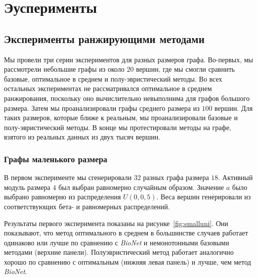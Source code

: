 \chapter{Эусперименты}





\section{Эксперименты ранжирующими методами}
\label{sec_experiments}

Мы провели три серии экспериментов для разных размеров графа.  Во-первых, мы
рассмотрели небольшие графы из около $20$ вершин, где мы смогли сравнить базовые,
оптимальное в среднем и полу-эвристический методы.  Во всех остальных
экспериментах не рассматривался оптимальное в среднем ранжирования, поскольку
оно вычислительно невыполнима для графов большого размера.  Затем мы
проанализировали графы среднего размера из $100$ вершин.  Для таких размеров,
которые ближе к реальным, мы проанализировали базовые и полу-эвристический
методы.  В конце мы протестировали методы на графе, взятого из реальных данных
из двух тысяч вершин.





\subsection{Графы маленького размера}

В первом эксперименте мы сгенерировали $32$ разных графа размера $18$.
Активный модуль размера $4$ был выбран равномерно случайным образом.  Значение
$a$ было выбрано равномерно из распределения $U(0, 0,5)$.  Веса вершин
генерировали из соответствующих бета- и равномерных распределений.

Результаты первого эксперимента показаны на рисунке~\ref{fig:smalluni}.  Они
показывают, что метод оптимального в среднем в большинстве случаев работает
одинаково или лучше по сравнению с \emph{BioNet} и немонотонными базовыми
методами (верхние панели).  Полуэвристический метод работает аналогично хорошо
по сравнению с оптимальным (нижняя левая панель) и лучше, чем метод
\emph{BioNet}.

